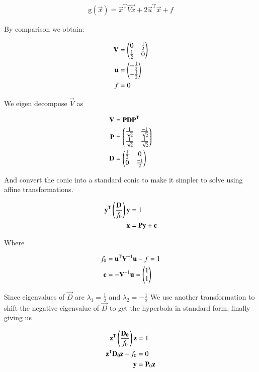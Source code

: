 \documentclass[journal]{IEEEtran}
\begin{document}
\begin{align}
	\text{g}(\vec{x}) = \vec{x}^\text{T}\vec{Vx} + 2\vec{u}^\text{T}\vec{x} + f \label{actual_conic}
\end{align}

By comparison we obtain:

\begin{align}
	\mathbf{V} &= \begin{pmatrix}0 & \frac{1}{2} \\ \frac{1}{2} & 0\end{pmatrix}\\
	\mathbf{u} &= \begin{pmatrix}-\frac{1}{2} \\ -\frac{1}{2}\end{pmatrix}\\
	f &= 0
\end{align}

We eigen decompose $\vec{V}$ as 

\begin{align}
	\mathbf{V} &= \mathbf{PDP}^\text{T}\\
	\mathbf{P} &= \begin{pmatrix}\frac{1}{\sqrt{2}} & \frac{-1}{\sqrt{2}} \\ \frac{1}{\sqrt{2}} & \frac{1}{\sqrt{2}}\end{pmatrix}\\
	\mathbf{D} &= \begin{pmatrix}\frac{1}{2} & 0 \\ 0 & \frac{-1}{2}\end{pmatrix}
\end{align}

And convert the conic into a standard conic to make it simpler to solve using affine transformations.

\begin{align}
	\mathbf{y}^\text{T}\left(\frac{\mathbf{D}}{f_0}\right)\mathbf{y} &= 1\\
	\mathbf{x} &= \mathbf{Py} + \mathbf{c} \label{t1}\\
\end{align}

Where 

\begin{align}
	f_0 &= \mathbf{u}^\text{T}\mathbf{V}^{-1}\mathbf{u} - f = 1\\
	\mathbf{c} &= -\mathbf{V}^{-1}\mathbf{u} = \begin{pmatrix}1 \\ 1\end{pmatrix}
\end{align}

Since eigenvalues of $\vec{D}$ are $\lambda_1 = \frac{1}{2}$ and $\lambda_2=-\frac{1}{2}$ We use another transformation to shift the negative eigenvalue of $\vec{D}$ to get the hyperbola in standard form, finally giving us

\begin{align}
	\mathbf{z}^\text{T}\left(\frac{\mathbf{D_0}}{f_0}\right)\mathbf{z} &= 1\\
	\mathbf{z}^\text{T}\mathbf{D_0}\mathbf{z} - f_0 &= 0  \label{standard_conic}\\
	\mathbf{y} &= \mathbf{P}_0\mathbf{z} \label{t2}\\
\end{align}
\end{document}
